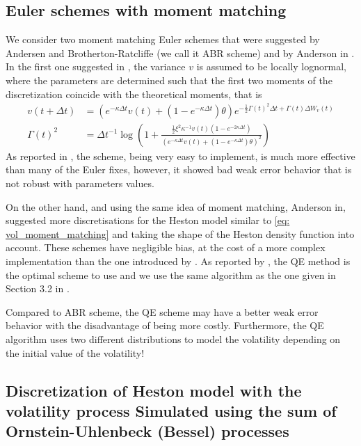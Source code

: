 \documentclass[11pt]{article}
\begin{document}
\subsection{Euler schemes with moment matching}\label{sec:Euler schemes with moment matching}
We consider two moment matching Euler schemes that were suggested by Andersen and Brotherton-Ratcliffe \cite{andersen2005extended} (we call it ABR scheme) and by Anderson in \cite{andersen2007efficient}. In the first one suggested in \cite{andersen2005extended},  the
variance $v$ is assumed to be locally lognormal, where the parameters are determined such that the first two moments of the discretization coincide with the theoretical moments, that is 
\begin{align}\label{eq: vol_moment_matching}
v(t+\Delta t)&= \left(e^{-\kappa \Delta t}  v(t) + \left( 1-e^{-\kappa \Delta t}\right) \theta  \right) e^{-\frac{1}{2} \Gamma(t)^2 \Delta t+\Gamma(t) \Delta W_v(t)}\nonumber\\
\Gamma(t)^2 &=\Delta t^{-1} \log \left(  1+ \frac{\frac{1}{2}\xi^2 \kappa^{-1} v(t) (1-e^{-2 \kappa \Delta t})}{\left( e^{-\kappa \Delta t} v(t) +(1-e^{- \kappa \Delta t}) \theta \right)^2 }\right)
\end{align}
As reported in \cite{lord2010comparison}, the scheme, being very easy
to implement, is much more effective than many of
the Euler fixes, however, it showed bad weak error behavior that is not robust with parameters values.

On the other hand, and using the same idea of moment matching, Anderson in\cite{andersen2007efficient}, suggested  more discretisations for the Heston model similar to \eqref{eq: vol_moment_matching} and taking the shape of the Heston density function into
account.  These schemes have negligible bias, at the cost of a more complex implementation than  the one introduced by \cite{andersen2005extended}. As reported by \cite{andersen2007efficient}, the QE method is the optimal scheme to use and we use the same algorithm as the one given in Section 3.2 in \cite{andersen2007efficient}.

Compared to ABR scheme, the QE scheme may have a better weak error behavior with the disadvantage of being more costly. Furthermore, the QE algorithm uses two different distributions to model the volatility depending on the initial value of the volatility!

\subsection{Discretization of Heston model with the volatility process Simulated using the sum of  Ornstein-Uhlenbeck (Bessel) processes}\label{sec:Discretization of Heston model with the volatility process Simulated using the sum of  Ornstein-Uhlenbeck (Bessel) processes}
\end{document}
